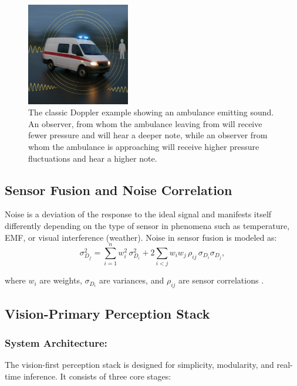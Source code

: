 \documentclass[12pt]{article}
\begin{document}
\begin{figure}[H]
	\centering
	\includegraphics[width=0.4\textwidth]{doppler}
	\caption{The classic Doppler example showing an ambulance emitting sound. An
	observer, from whom the ambulance leaving from will receive fewer pressure and
will hear a deeper note, while an observer from whom the ambulance is
approaching will receive higher pressure fluctuations and hear a higher note.}
	\label{fig:doppler}
\end{figure}
\subsection{Sensor Fusion and Noise Correlation}

Noise is a deviation of the response to the ideal signal and manifests itself
differently depending on the type of sensor in phenomena such as temperature,
EMF, or visual interference (weather). Noise in sensor fusion is modeled as:
\begin{equation}
\sigma_{D_f}^2 = \sum_{i=1}^{n} w_i^2\,\sigma_{D_i}^2 + 2\sum_{i<j} w_i
w_j\,\rho_{ij}\,\sigma_{D_i}\sigma_{D_j},
\label{eq:noise}
\end{equation}

where \( w_i \) are weights, \( \sigma_{D_i} \) are variances, and \( \rho_{ij}
\) are sensor correlations \cite{Rana2023PerceptionSystems}.

\subsection{Vision-Primary Perception Stack}

\subsubsection{System Architecture:}

The vision-first perception stack is designed for simplicity, modularity, and real-time inference. It consists of three core stages:
\end{document}
